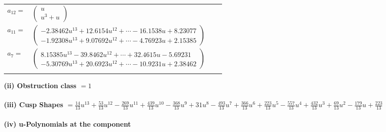 \documentclass[1p]{elsarticle_modified}
\theoremstyle{definition}
\begin{document}
\begin{tabular}{m{7pt} m{180pt} m{7pt} m{180pt} }
\flushright $a_{12}=$&$\begin{pmatrix}u\\u^3+u\end{pmatrix}$ \\
\flushright $a_{11}=$&$\begin{pmatrix}-2.38462 u^{13}+12.6154 u^{12}+\cdots-16.1538 u+8.23077\\-1.92308 u^{13}+9.07692 u^{12}+\cdots-4.76923 u+2.15385\end{pmatrix}$ \\
\flushright $a_{7}=$&$\begin{pmatrix}8.15385 u^{13}-39.8462 u^{12}+\cdots+32.4615 u-5.69231\\-5.30769 u^{13}+20.6923 u^{12}+\cdots-10.9231 u+2.38462\end{pmatrix}$\\&\end{tabular}
\flushleft \textbf{(ii) Obstruction class $= 1$}\\~\\
\flushleft \textbf{(iii) Cusp Shapes $= \frac{14}{13} u^{13}+\frac{53}{13} u^{12}-\frac{269}{13} u^{11}+\frac{439}{13} u^{10}-\frac{368}{13} u^9+31 u^8-\frac{493}{13} u^7+\frac{366}{13} u^6+\frac{223}{13} u^5-\frac{557}{13} u^4+\frac{432}{13} u^3+\frac{69}{13} u^2-\frac{179}{13} u+\frac{223}{13}$}\\~\\
\newpage\renewcommand{\arraystretch}{1}
\flushleft \textbf{(iv) u-Polynomials at the component}\newline \\
\end{document}
